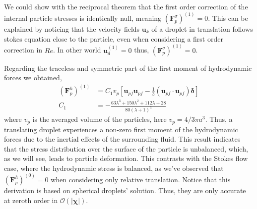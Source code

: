 We could show with the reciprocal theorem that the first order correction of the internal particle stresses is identically null, meaning $(\textbf{F}^\sigma_p)^{(1)} = 0$. 
This can be explained by noticing that the velocity fields $\textbf{u}_k$ of a droplet in translation follows stokes equation close to the particle, even when considering a first order correction in $Re$.
In other world $\textbf{u}^{(1)}_d =0 $ thus,  $(\textbf{F}^\sigma_p)^{(1)} = 0$. 

Regarding the traceless and symmetric part of the first moment of hydrodynamic forces we obtained, 
\begin{align}
    (\textbf{F}^h_p)^{(1)}  
    &=
    C_1 v_p
    [
        \textbf{u}_{pf}\textbf{u}_{pf} - \frac{1}{3}(\textbf{u}_{pf}\cdot \textbf{u}_{pf})\bm\delta 
    ]\\
    C_1 &=
    - \frac{63 \lambda^{3} + 150 \lambda^{2} + 112 \lambda + 28}{80 \left(\lambda + 1\right)^{3}}
    \label{eq:closure_sigma_e}
\end{align}
where $v_p$ is the averaged volume of the particles, here $v_p = 4/3 \pi a^3$.  
Thus, a translating droplet experiences a non-zero first moment of the hydrodynamic forces due to the inertial effects of the surrounding fluid. This result indicates that the stress distribution over the surface of the particle is unbalanced, which, as we will see, leads to particle deformation.
This contrasts with the Stokes flow case, where the hydrodynamic stress is balanced, as we've observed that $(\textbf{F}^h_p)^{(0)} = 0$ when considering only relative translation.  
Notice that this derivation is based on spherical droplets' solution. 
Thus, they are only accurate at zeroth order in  $\mathcal{O}(|\bm\chi|)$. 


